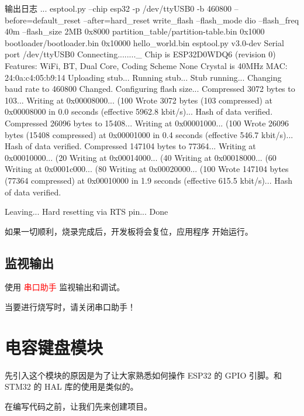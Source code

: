 \documentclass[lang=cn,newtx,10pt,scheme=chinese]{elegantbook}
\begin{document}
\begin{mycode}{输出日志}
...
esptool.py --chip esp32 -p /dev/ttyUSB0 -b 460800 --before=default_reset --after=hard_reset write_flash --flash_mode dio --flash_freq 40m --flash_size 2MB 0x8000 partition_table/partition-table.bin 0x1000 bootloader/bootloader.bin 0x10000 hello_world.bin
esptool.py v3.0-dev
Serial port /dev/ttyUSB0
Connecting........_
Chip is ESP32D0WDQ6 (revision 0)
Features: WiFi, BT, Dual Core, Coding Scheme None
Crystal is 40MHz
MAC: 24:0a:c4:05:b9:14
Uploading stub...
Running stub...
Stub running...
Changing baud rate to 460800
Changed.
Configuring flash size...
Compressed 3072 bytes to 103...
Writing at 0x00008000... (100 %
Wrote 3072 bytes (103 compressed) at 0x00008000 in 0.0 seconds (effective 5962.8 kbit/s)...
Hash of data verified.
Compressed 26096 bytes to 15408...
Writing at 0x00001000... (100 %
Wrote 26096 bytes (15408 compressed) at 0x00001000 in 0.4 seconds (effective 546.7 kbit/s)...
Hash of data verified.
Compressed 147104 bytes to 77364...
Writing at 0x00010000... (20 %
Writing at 0x00014000... (40 %
Writing at 0x00018000... (60 %
Writing at 0x0001c000... (80 %
Writing at 0x00020000... (100 %
Wrote 147104 bytes (77364 compressed) at 0x00010000 in 1.9 seconds (effective 615.5 kbit/s)...
Hash of data verified.

Leaving...
Hard resetting via RTS pin...
Done
\end{mycode}

如果一切顺利，烧录完成后，开发板将会复位，应用程序  开始运行。

\section{监视输出}

使用 \textcolor{red}{串口助手} 监视输出和调试。

\begin{marker}
当要进行烧写时，请关闭串口助手！
\end{marker}

\chapter{电容键盘模块}

先引入这个模块的原因是为了让大家熟悉如何操作 ESP32 的 GPIO 引脚。和 STM32 的 HAL 库的使用是类似的。

在编写代码之前，让我们先来创建项目。
\end{document}
